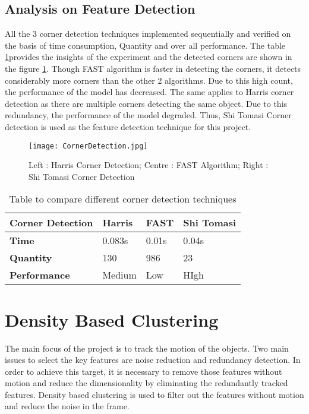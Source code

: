 \subsection{Analysis on Feature Detection}
All the 3 corner detection techniques implemented sequentially and verified on the basis of time consumption, Quantity and over all performance. The table \ref{table:1}provides the insights of the experiment and the detected corners are shown in the figure \ref{fig:CornerDetection}. Though FAST algorithm is faster in detecting the corners, it detects considerably more corners than the other 2 algorithms. Due to this high count, the performance of the model has decreased. The same applies to Harris corner detection as there are multiple corners detecting the same object. Due to this redundancy, the performance of the model degraded. Thus, Shi Tomasi Corner detection is used as the feature detection technique for this project.
\begin{figure}[tb]
	\center\texttt{[image: CornerDetection.jpg]}
	\caption{Left : Harris Corner Detection; Centre : FAST Algorithm; Right : Shi Tomasi Corner Detection}
	\label{fig:CornerDetection}
\end{figure}

\begin{table}[h!]
\centering
 \begin{tabular}{| p{4cm} ||p{3cm} p{3cm} p{3cm} |} 
 \hline
 \textbf{Corner Detection} & \textbf{Harris}  & \textbf{FAST} & \textbf{Shi Tomasi} \\
 \hline\hline
 \textbf{Time} & 0.083s & 0.01s & 0.04s \\
 \hline
 \textbf{Quantity} & 130 & 986 & 23 \\
 \hline
 \textbf{Performance} & Medium & Low & HIgh \\
 \hline
\end{tabular}
\caption{Table to compare different corner detection techniques}
\label{table:1}
\end{table}

\section{Density Based Clustering}
The main focus of the project is to track the motion of the objects. Two main issues to select the key features are noise reduction and redundancy detection. In order to achieve this target, it is necessary to remove those features without motion and reduce the dimensionality by eliminating the redundantly tracked features. Density based clustering is used to filter out the features without motion and reduce the noise in the frame.
